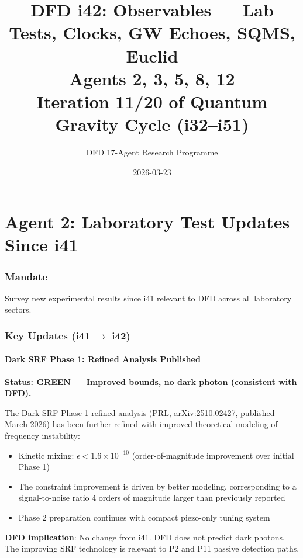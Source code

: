 \documentclass[11pt,a4paper]{article}
\title{DFD i42: Observables --- Lab Tests, Clocks, GW Echoes, SQMS, Euclid\\[6pt]
\large Agents 2, 3, 5, 8, 12\\[6pt]
\normalsize Iteration 11/20 of Quantum Gravity Cycle (i32--i51)}
\author{DFD 17-Agent Research Programme}
\date{2026-03-23}
\newcommand{\GREEN}{\textcolor{dfdgreen}{\textbf{GREEN}}}
\begin{document}
\maketitle
\tableofcontents
\newpage

\part{Agent 2: Laboratory Test Updates Since i41}
\label{part:agent2}

\section{Mandate}

Survey new experimental results since i41 relevant to DFD across all laboratory sectors.

\section{Key Updates (i41 $\to$ i42)}

\subsection{Dark SRF Phase 1: Refined Analysis Published}

\textbf{Status: \GREEN{} --- Improved bounds, no dark photon (consistent with DFD).}

The Dark SRF Phase 1 refined analysis (PRL, arXiv:2510.02427, published March 2026) has been further refined with improved theoretical modeling of frequency instability:
\begin{itemize}
\item Kinetic mixing: $\epsilon < 1.6 \times 10^{-10}$ (order-of-magnitude improvement over initial Phase 1)
\item The constraint improvement is driven by better modeling, corresponding to a signal-to-noise ratio 4 orders of magnitude larger than previously reported
\item Phase 2 preparation continues with compact piezo-only tuning system
\end{itemize}

\textbf{DFD implication}: No change from i41. DFD does not predict dark photons. The improving SRF technology is relevant to P2 and P11 passive detection paths.
\end{document}
